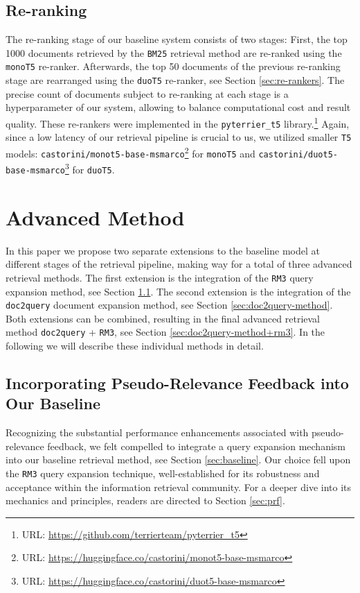 \documentclass[sigconf]{acmart}
\begin{document}
\subsection{Re-ranking}
The re-ranking stage of our baseline system consists of two stages: First, the top 1000 documents retrieved by the \texttt{BM25} retrieval method are re-ranked using the \texttt{monoT5} re-ranker. Afterwards, the top 50 documents of the previous re-ranking stage are rearranged using the \texttt{duoT5} re-ranker, see Section \ref{sec:re-rankers}. The precise count of documents subject to re-ranking at each stage is a hyperparameter of our system, allowing to balance computational cost and result quality. These re-rankers were implemented in the \texttt{pyterrier\_t5} library.\footnote{URL: \url{https://github.com/terrierteam/pyterrier_t5}} Again, since a low latency of our retrieval pipeline is crucial to us, we utilized smaller \texttt{T5} models: \texttt{castorini\-/monot5\--base\--msmarco}\footnote{URL: \url{https://huggingface.co/castorini/monot5-base-msmarco}} for \texttt{monoT5} and \texttt{castorini\-/duot5\--base\--msmarco}\footnote{URL: \url{https://huggingface.co/castorini/duot5-base-msmarco}} for \texttt{duoT5}.


\section{Advanced Method}
In this paper we propose two separate extensions to the baseline model at different stages of the retrieval pipeline, making way for a total of three advanced retrieval methods. The first extension is the integration of the \texttt{RM3} query expansion method, see Section \ref{sec:baseline+rm3}. The second extension is the integration of the \texttt{doc2query} document expansion method, see Section \ref{sec:doc2query-method}. Both extensions can be combined, resulting in the final advanced retrieval method \texttt{doc2query} + \texttt{RM3}, see Section \ref{sec:doc2query-method+rm3}. In the following we will describe these individual methods in detail.

\subsection{Incorporating Pseudo-Relevance Feedback into Our Baseline}\label{sec:baseline+rm3}
Recognizing the substantial performance enhancements associated with pseudo-relevance feedback, we felt compelled to integrate a query expansion mechanism into our baseline retrieval method, see Section \ref{sec:baseline}. Our choice fell upon the \texttt{RM3} query expansion technique, well-established for its robustness and acceptance within the information retrieval community. For a deeper dive into its mechanics and principles, readers are directed to Section \ref{sec:prf}.
\end{document}
